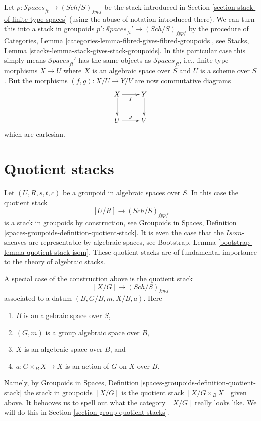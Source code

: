 \documentclass{stacks-project}
\theoremstyle{plain}
\theoremstyle{definition}
\theoremstyle{remark}
\numberwithin{equation}{subsection}
\def\Sch{\mathit{Sch}}
\def\Spacesstack{\mathcal{S}\!\mathit{paces}}
\begin{document}
\noindent
Let $p : \Spacesstack_{ft} \to (\Sch/S)_{fppf}$ be the stack
introduced in
Section \ref{section-stack-of-finite-type-spaces}
(using the abuse of notation introduced there).
We can turn this into a stack in groupoids
$p' : \Spacesstack_{ft}' \to (\Sch/S)_{fppf}$ by
the procedure of
Categories, Lemma \ref{categories-lemma-fibred-gives-fibred-groupoids},
see
Stacks, Lemma \ref{stacks-lemma-stack-gives-stack-groupoids}.
In this particular case this simply means $\Spacesstack_{ft}'$
has the same objects as $\Spacesstack_{ft}$, i.e., finite type morphisms
$X \to U$ where $X$ is an algebraic space over $S$ and $U$ is a scheme
over $S$. But the morphisms $(f, g) : X/U \to Y/V$ are now
commutative diagrams
$$
\xymatrix{
X \ar[d] \ar[r]_f & Y \ar[d] \\
U \ar[r]^g & V
}
$$
which are cartesian.



\section{Quotient stacks}
\label{section-quotient-stacks}

\noindent
Let $(U, R, s, t, c)$ be a groupoid in algebraic spaces over $S$.
In this case the quotient stack
$$
[U/R] \longrightarrow (\Sch/S)_{fppf}
$$
is a stack in groupoids by construction, see
Groupoids in Spaces,
Definition \ref{spaces-groupoids-definition-quotient-stack}.
It is even the case that the $\mathit{Isom}$-sheaves are
representable by algebraic spaces, see
Bootstrap, Lemma \ref{bootstrap-lemma-quotient-stack-isom}.
These quotient stacks are of fundamental importance to the theory of
algebraic stacks.

\medskip\noindent
A special case of the construction above is the quotient stack
$$
[X/G] \longrightarrow (\Sch/S)_{fppf}
$$
associated to a datum $(B, G/B, m, X/B, a)$. Here
\begin{enumerate}
\item $B$ is an algebraic space over $S$,
\item $(G, m)$ is a group algebraic space over $B$,
\item $X$ is an algebraic space over $B$, and
\item $a : G \times_B X \to X$ is an action of $G$ on $X$ over $B$.
\end{enumerate}
Namely, by
Groupoids in Spaces,
Definition \ref{spaces-groupoids-definition-quotient-stack}
the stack in groupoids $[X/G]$ is the
quotient stack $[X/G \times_B X]$ given above. It behooves us to
spell out what the category $[X/G]$ really looks like. We will do this in
Section \ref{section-group-quotient-stacks}.
\end{document}
